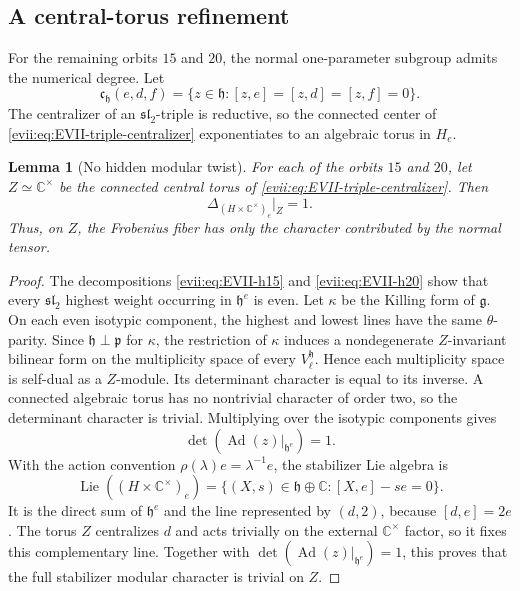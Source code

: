 \documentclass[10pt,a4paper]{amsart}
\numberwithin{equation}{section}
\newtheorem{lemma}[theorem]{Lemma}
\newcommand{\C}{\mathbb C}
\newcommand{\Lie}{\operatorname{Lie}}
\newcommand{\Ad}{\operatorname{Ad}}
\newcommand{\fg}{\mathfrak g}
\newcommand{\fh}{\mathfrak h}
\newcommand{\fp}{\mathfrak p}
\begin{document}
\subsection{A central-torus refinement}

For the remaining orbits $15$ and $20$, the normal one-parameter subgroup
admits the numerical degree.  Let
\begin{equation}\label{evii:eq:EVII-triple-centralizer}
 \mathfrak c_{\fh}(e,d,f)
 =\{z\in\fh:[z,e]=[z,d]=[z,f]=0\}.
\end{equation}
The centralizer of an $\mathfrak{sl}_2$-triple is reductive, so the connected
center of \eqref{evii:eq:EVII-triple-centralizer} exponentiates to an algebraic
torus in $H_e$.

\begin{lemma}[No hidden modular twist]\label{evii:lem:EVII-modular-torus}
For each of the orbits $15$ and $20$, let $Z\simeq\C^\times$ be the connected
central torus of \eqref{evii:eq:EVII-triple-centralizer}.  Then
\begin{equation}\label{evii:eq:EVII-modular-Z}
 \Delta_{(H\times\C^\times)_e}|_Z=1.
\end{equation}
Thus, on $Z$, the Frobenius fiber has only the character contributed by the
normal tensor.
\end{lemma}

\begin{proof}
The decompositions \eqref{evii:eq:EVII-h15} and \eqref{evii:eq:EVII-h20} show that
every $\mathfrak{sl}_2$ highest weight occurring in $\fh^e$ is even.  Let
$\kappa$ be the Killing form of $\fg$.  On each even isotypic component, the
highest and lowest lines have the same $\theta$-parity.  Since
$\fh\perp\fp$ for $\kappa$, the restriction of $\kappa$ induces a
nondegenerate $Z$-invariant bilinear form on the multiplicity space of every
$V_\ell^{\fh}$.  Hence each multiplicity space is self-dual as a $Z$-module.
Its determinant character is equal to its inverse.  A connected algebraic
torus has no nontrivial character of order two, so the determinant character
is trivial.  Multiplying over the isotypic components gives
\[
 \det(\Ad(z)|_{\fh^e})=1.
\]
With the action convention $\rho(\lambda)e=\lambda^{-1}e$, the stabilizer
Lie algebra is
\[
 \Lie((H\times\C^\times)_e)
 =\{(X,s)\in\fh\oplus\C:[X,e]-se=0\}.
\]
It is the direct sum of $\fh^e$ and the line represented by $(d,2)$, because
$[d,e]=2e$.  The torus $Z$ centralizes $d$ and acts trivially on the external
$\C^\times$ factor, so it fixes this complementary line.  Together with
$\det(\Ad(z)|_{\fh^e})=1$, this proves that the full stabilizer modular
character is trivial on $Z$.
\end{proof}
\end{document}
